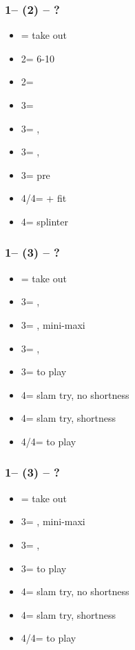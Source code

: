 \documentclass[12pt, a4paper]{article}
\begin{document}
\subsubsection*{1\spades -- (2\hearts) -- ?}
\begin{itemize}
    \item \dbl = take out
    \item 2\spades = 6-10
    \item 2\nt = \clubs \invp
    \item 3\clubs = \diams \invp
    \item 3\diams = \spades, \gf
    \item 3\hearts = \spades, \inv
    \item 3\spades = pre
    \item 4\clubs/4\diams = \nat + fit
    \item 4\hearts = splinter
\end{itemize}

\subsubsection*{1\spades -- (3\clubs) -- ?}
\begin{itemize}
    \item \dbl = take out
    \item 3\diams = \hearts, \invp
    \item 3\hearts = \spades, mini-maxi
    \item 3\spades = \spades, \inv
    \item 3\nt = to play
    \item 4\clubs = slam try, no \clubs shortness
    \item 4\diams = slam try, \clubs shortness
    \item 4\hearts/4\spades = to play
\end{itemize}

\subsubsection*{1\spades -- (3\diams) -- ?}
\begin{itemize}
    \item \dbl = take out
    \item 3\hearts = \spades, mini-maxi
    \item 3\spades = \spades, \inv
    \item 3\nt = to play
    \item 4\clubs = slam try, no \diams shortness
    \item 4\diams = slam try, \diams shortness
    \item 4\hearts/4\spades = to play
\end{itemize}
\end{document}
